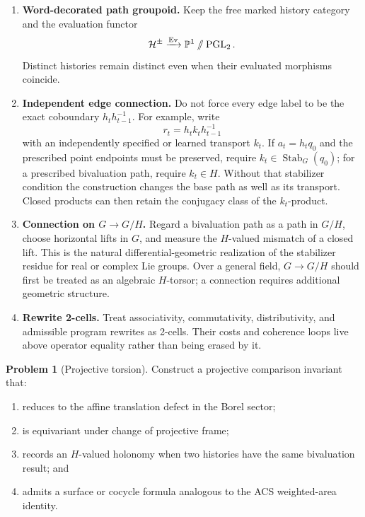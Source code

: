 \documentclass[11pt]{article}
\theoremstyle{definition}
\newtheorem{problem}[theorem]{Problem}
\theoremstyle{remark}
\newcommand{\PGL}{\operatorname{PGL}}
\newcommand{\Stab}{\operatorname{Stab}}
\newcommand{\Ev}{\operatorname{Ev}}
\newcommand{\PP}{\mathbb P}
\newcommand{\cH}{\mathcal H}
\newcommand{\sslash}{\mathbin{/\mkern-6mu/}}
\begin{document}
\begin{enumerate}
  \item \textbf{Word-decorated path groupoid.}
  Keep the free marked history category and the evaluation functor
  \[
  \cH^\pm\xrightarrow{\Ev}\PP^1\sslash\PGL_2.
  \]
  Distinct histories remain distinct even when their evaluated morphisms
  coincide.

  \item \textbf{Independent edge connection.}
  Do not force every edge label to be the exact coboundary
  \(h_t h_{t-1}^{-1}\).  For example, write
  \[
  r_t=h_t k_t h_{t-1}^{-1}
  \]
  with an independently specified or learned transport \(k_t\).  If
  \(a_t=h_tq_0\) and the prescribed point endpoints must be preserved, require
  \(k_t\in\Stab_G(q_0)\); for a prescribed bivaluation path, require
  \(k_t\in H\).  Without that stabilizer condition the construction changes
  the base path as well as its transport.  Closed products can then retain the
  conjugacy class of the \(k_t\)-product.

  \item \textbf{Connection on \(G\to G/H\).}
  Regard a bivaluation path as a path in \(G/H\), choose horizontal lifts in
  \(G\), and measure the \(H\)-valued mismatch of a closed lift.  This is the
  natural differential-geometric realization of the stabilizer residue for
  real or complex Lie groups.  Over a general field, \(G\to G/H\) should first
  be treated as an algebraic \(H\)-torsor; a connection requires additional
  geometric structure.

  \item \textbf{Rewrite 2-cells.}
  Treat associativity, commutativity, distributivity, and admissible program
  rewrites as 2-cells.  Their costs and coherence loops live above operator
  equality rather than being erased by it.
\end{enumerate}

\begin{problem}[Projective torsion]
Construct a projective comparison invariant that:
\begin{enumerate}
  \item reduces to the affine translation defect in the Borel sector;
  \item is equivariant under change of projective frame;
  \item records an \(H\)-valued holonomy when two histories have the same
  bivaluation result; and
  \item admits a surface or cocycle formula analogous to the ACS weighted-area
  identity.
\end{enumerate}
\end{problem}
\end{document}
